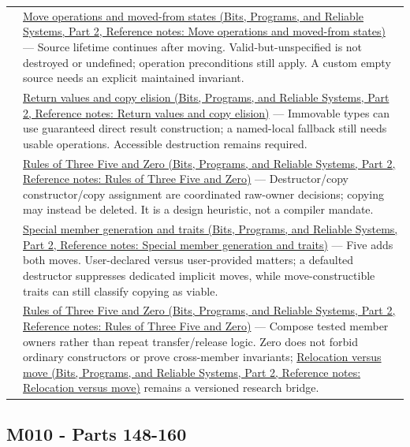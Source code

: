 {\begin{longtable}[]{@{}
  >{\raggedright\arraybackslash}p{}
  >{\raggedright\arraybackslash}p{}@{}}
143 & \href{../01-Bits-Programs-and-Reliable-Systems-P02/main.pdf\#nameddest=appendix-5636651017c2}{Move operations and moved-from states (Bits, Programs, and Reliable Systems, Part 2, Reference notes: Move operations and moved-from states)} --- Source lifetime continues after moving. Valid-but-unspecified is not destroyed or undefined; operation preconditions still apply. A custom empty source needs an explicit maintained invariant. \\
144 & \href{../01-Bits-Programs-and-Reliable-Systems-P02/main.pdf\#nameddest=appendix-b08d3788c5c6}{Return values and copy elision (Bits, Programs, and Reliable Systems, Part 2, Reference notes: Return values and copy elision)} --- Immovable types can use guaranteed direct result construction; a named-local fallback still needs usable operations. Accessible destruction remains required. \\
145 & \href{../01-Bits-Programs-and-Reliable-Systems-P02/main.pdf\#nameddest=appendix-7679107d057e}{Rules of Three Five and Zero (Bits, Programs, and Reliable Systems, Part 2, Reference notes: Rules of Three Five and Zero)} --- Destructor/copy constructor/copy assignment are coordinated raw-owner decisions; copying may instead be deleted. It is a design heuristic, not a compiler mandate. \\
146 & \href{../01-Bits-Programs-and-Reliable-Systems-P02/main.pdf\#nameddest=appendix-42e02a12c694}{Special member generation and traits (Bits, Programs, and Reliable Systems, Part 2, Reference notes: Special member generation and traits)} --- Five adds both moves. User-declared versus user-provided matters; a defaulted destructor suppresses dedicated implicit moves, while move-constructible traits can still classify copying as viable. \\
147 & \href{../01-Bits-Programs-and-Reliable-Systems-P02/main.pdf\#nameddest=appendix-7679107d057e}{Rules of Three Five and Zero (Bits, Programs, and Reliable Systems, Part 2, Reference notes: Rules of Three Five and Zero)} --- Compose tested member owners rather than repeat transfer/release logic. Zero does not forbid ordinary constructors or prove cross-member invariants; \href{../01-Bits-Programs-and-Reliable-Systems-P02/main.pdf\#nameddest=appendix-adfd6397af8d}{Relocation versus move (Bits, Programs, and Reliable Systems, Part 2, Reference notes: Relocation versus move)} remains a versioned research bridge. \\
\end{longtable}
}

\subsection{M010 - Parts 148-160}\label{appendix-fd090d982a15-m010---parts-148-160}

